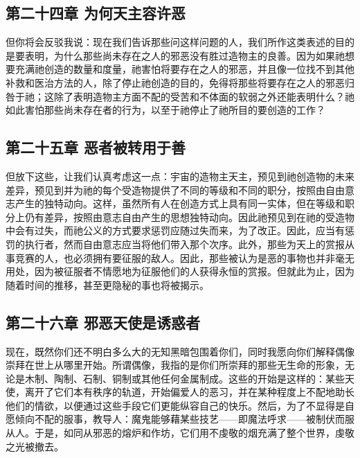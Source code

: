 
\subsection{第二十四章 为何天主容许恶}

但你将会反驳我说：现在我们告诉那些问这样问题的人，我们所作这类表述的目的是要表明，为什么那些尚未存在之人的邪恶没有胜过造物主的良善。因为如果祂想要充满祂创造的数量和度量，祂害怕将要存在之人的邪恶，并且像一位找不到其他补救和医治方法的人，除了停止祂创造的目的，免得将那些将要存在之人的邪恶归咎于祂；这除了表明造物主方面不配的受苦和不体面的软弱之外还能表明什么？祂如此害怕那些尚未存在者的行为，以至于祂停止了祂所目的要创造的工作？\par


\subsection{第二十五章 恶者被转用于善}

但放下这些，让我们认真考虑这一点：宇宙的造物主天主，预见到祂创造物的未来差异，预见到并为祂的每个受造物提供了不同的等级和不同的职分，按照由自由意志产生的独特动向。这样，虽然所有人在创造方式上具有同一实体，但在等级和职分上仍有差异，按照由意志自由产生的思想独特动向。因此祂预见到在祂的受造物中会有过失，而祂公义的方式要求惩罚应随过失而来，为了改正。因此，应当有惩罚的执行者，然而自由意志应当将他们带入那个次序。此外，那些为天上的赏报从事竞赛的人，也必须拥有要征服的敌人。因此，那些被认为是恶的事物也并非毫无用处，因为被征服者不情愿地为征服他们的人获得永恒的赏报。但就此为止，因为随着时间的推移，甚至更隐秘的事也将被揭示。\par


\subsection{第二十六章 邪恶天使是诱惑者}

现在，既然你们还不明白多么大的无知黑暗包围着你们，同时我愿向你们解释偶像崇拜在世上从哪里开始。所谓偶像，我指的是你们所崇拜的那些无生命的形象，无论是木制、陶制、石制、铜制或其他任何金属制成。这些的开始是这样的：某些天使，离开了它们本有秩序的轨道，开始偏爱人的恶习，并在某种程度上不配地助长他们的情欲，以便通过这些手段它们更能纵容自己的快乐。然后，为了不显得是自愿倾向不配的服事，教导人：魔鬼能够藉某些技艺——即魔法呼求——被制伏而服从人。于是，如同从邪恶的熔炉和作坊，它们用不虔敬的烟充满了整个世界，虔敬之光被撤去。\par


